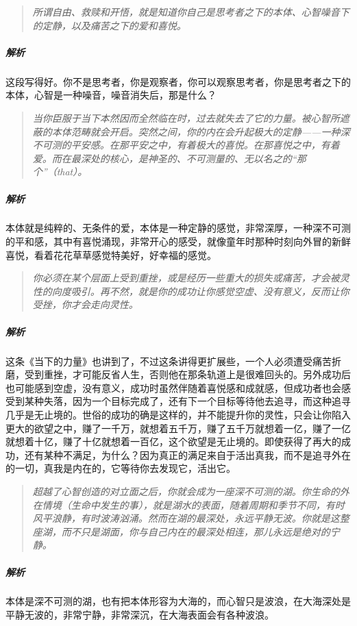 \begin{quote}\it
    所谓自由、救赎和开悟，就是知道你自己是思考者之下的本体、心智噪音下的定静，以及痛苦之下的爱和喜悦。
\end{quote}

\subparagraph{解析} 这段写得好。你不是思考者，你是观察者，你可以观察思考者，你是思考者之下的本体，心智是一种噪音，噪音消失后，那是什么？

\begin{quote}\it
    当你臣服于当下本然因而全然临在时，过去就失去了它的力量。被心智所遮蔽的本体范畴就会开启。突然之间，你的内在会升起极大的定静——一种深不可测的平安感。在那平安之中，有着极大的喜悦。在那喜悦之中，有着爱。而在最深处的核心，是神圣的、不可测量的、无以名之的“那个”（that）。
\end{quote}

\subparagraph{解析} 本体就是纯粹的、无条件的爱，本体是一种定静的感觉，非常深厚，一种深不可测的平和感，其中有喜悦涌现，非常开心的感受，就像童年时那种时刻向外冒的新鲜喜悦，看着花花草草感觉特美好，好幸福的感觉。

\begin{quote}\it
    你必须在某个层面上受到重挫，或是经历一些重大的损失或痛苦，才会被灵性的向度吸引。再不然，就是你的成功让你感觉空虚、没有意义，反而让你受挫，你才会走向灵性。
\end{quote}

\subparagraph{解析} 这条《当下的力量》也讲到了，不过这条讲得更扩展些，一个人必须遭受痛苦折磨，受到重挫，才可能反省人生，否则他在那条轨道上是很难回头的。另外成功后也可能感到空虚，没有意义，成功时虽然伴随着喜悦感和成就感，但成功者也会感受到某种失落，因为一个目标完成了，还有下一个目标等待他去追寻，而这种追寻几乎是无止境的。世俗的成功的确是这样的，并不能提升你的灵性，只会让你陷入更大的欲望之中，赚了一千万，就想着五千万，赚了五千万就想着一亿，赚了一亿就想着十亿，赚了十亿就想着一百亿，这个欲望是无止境的。即使获得了再大的成功，还有某种不满足，为什么？因为真正的满足来自于活出真我，而不是追寻外在的一切，真我是内在的，它等待你去发现它，活出它。

\begin{quote}\it
    超越了心智创造的对立面之后，你就会成为一座深不可测的湖。你生命的外在情境（生命中发生的事），就是湖水的表面，随着周期和季节不同，有时风平浪静，有时波涛汹涌。然而在湖的最深处，永远平静无波。你就是这整座湖，而不只是湖面，你与自己内在的最深处相连，那儿永远是绝对的宁静。
\end{quote}

\subparagraph{解析} 本体是深不可测的湖，也有把本体形容为大海的，而心智只是波浪，在大海深处是平静无波的，非常宁静，非常深沉，在大海表面会有各种波浪。

